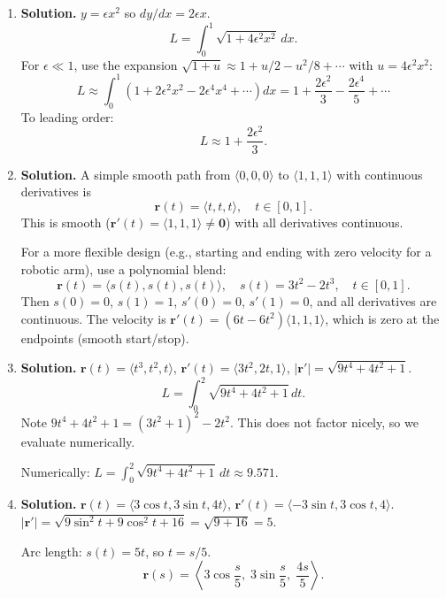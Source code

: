 \begin{enumerate}
This integral does not have a simple closed form; we express it as:
\[
\boxed{L=\int_0^2\sqrt{e^{2t}+e^{-2t}+1}\,dt \approx 7.212.}
\]
(Numerical evaluation gives $L\approx 7.212$.)

\item \textbf{Solution.}
$y=\epsilon x^2$ so $dy/dx=2\epsilon x$.
\[
L = \int_0^1\sqrt{1+4\epsilon^2 x^2}\,dx.
\]
For $\epsilon\ll 1$, use the expansion $\sqrt{1+u}\approx 1+u/2-u^2/8+\cdots$ with $u=4\epsilon^2 x^2$:
\[
L\approx \int_0^1\left(1+2\epsilon^2 x^2 - 2\epsilon^4 x^4+\cdots\right)dx = 1+\frac{2\epsilon^2}{3}-\frac{2\epsilon^4}{5}+\cdots
\]
To leading order:
\[
\boxed{L\approx 1+\frac{2\epsilon^2}{3}.}
\]

\item \textbf{Solution.}
A simple smooth path from $\langle 0,0,0\rangle$ to $\langle 1,1,1\rangle$ with continuous derivatives is
\[
\mathbf{r}(t) = \langle t, t, t\rangle, \quad t\in[0,1].
\]
This is smooth ($\mathbf{r}'(t)=\langle 1,1,1\rangle\neq\mathbf{0}$) with all derivatives continuous.

For a more flexible design (e.g., starting and ending with zero velocity for a robotic arm), use a polynomial blend:
\[
\mathbf{r}(t)=\langle s(t), s(t), s(t)\rangle, \quad s(t)=3t^2-2t^3, \quad t\in[0,1].
\]
Then $s(0)=0$, $s(1)=1$, $s'(0)=0$, $s'(1)=0$, and all derivatives are continuous. The velocity is
$\mathbf{r}'(t)=(6t-6t^2)\langle 1,1,1\rangle$, which is zero at the endpoints (smooth start/stop).


\item \textbf{Solution.}
$\mathbf{r}(t)=\langle t^3, t^2, t\rangle$, $\mathbf{r}'(t)=\langle 3t^2, 2t, 1\rangle$, $|\mathbf{r}'|=\sqrt{9t^4+4t^2+1}$.
\[
L=\int_0^2\sqrt{9t^4+4t^2+1}\,dt.
\]
Note $9t^4+4t^2+1=(3t^2+1)^2-2t^2$. This does not factor nicely, so we evaluate numerically.

Numerically: $\boxed{L=\int_0^2\sqrt{9t^4+4t^2+1}\,dt \approx 9.571.}$

\item \textbf{Solution.}
$\mathbf{r}(t)=\langle 3\cos t, 3\sin t, 4t\rangle$, $\mathbf{r}'(t)=\langle -3\sin t, 3\cos t, 4\rangle$.
$|\mathbf{r}'|=\sqrt{9\sin^2 t+9\cos^2 t+16}=\sqrt{9+16}=5$.

Arc length: $s(t)=5t$, so $t=s/5$.
\[
\boxed{\mathbf{r}(s)=\left\langle 3\cos\frac{s}{5},\; 3\sin\frac{s}{5},\; \frac{4s}{5}\right\rangle.}
\]


\end{enumerate}
